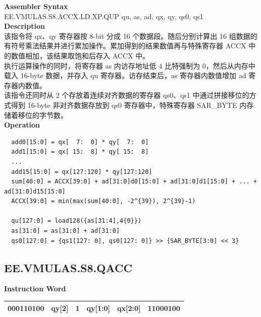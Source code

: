 \textbf{Assembler Syntax} \\
EE.VMULAS.S8.ACCX.LD.XP.QUP qu, as, ad, qx, qy, qs0, qs1 \\
\textbf{Description} \\
该指令将 qx、qy 寄存器按 8-bit 分成 16 个数据段。随后分别计算出 16 组数据的有符号乘法结果并进行累加操作。累加得到的结果数值再与特殊寄存器 ACCX 中的数值相加，该结果取饱和后存入 ACCX 中。\\
执行运算操作的同时，将寄存器 as 内访存地址低 4 比特强制为 0，然后从内存中载入 16-byte 数据，并存入 qu 寄存器。访存结束后，as 寄存器内数值增加 ad 寄存器内数值。\\
该指令还同时从 2 个存放着连续对齐数据的寄存器 qs0、qs1 中通过拼接移位的方式得到 16-byte 非对齐数据存放到 qs0 寄存器中，特殊寄存器 SAR\_BYTE 内存储着移位的字节数。\\
\textbf{Operation}
\begin{lstlisting}
  add0[15:0] = qx[  7:  0] * qy[  7:  0]
  add1[15:0] = qx[ 15:  8] * qy[ 15:  8]
  ...
  add15[15:0] = qx[127:120] * qy[127:120]
  sum[40:0] = ACCX[39:0] + ad[31:0]d0[15:0] + ad[31:0]d1[15:0] + ... + ad[31:0]d15[15:0]
  ACCX[39:0] = min(max(sum[40:0], -2^{39}), 2^{39}-1)

  qu[127:0] = load128({as[31:4],4{0}})
  as[31:0] = as[31:0] + ad[31:0]
  qs0[127:0] = {qs1[127: 0], qs0[127: 0]} >> {SAR_BYTE[3:0] << 3}
\end{lstlisting}

\clearpage
\subsection{EE.VMULAS.S8.QACC}\label{instruction:EEVMULASS8QACC}
\setlength\tabcolsep{6pt}
\textbf{Instruction Word} \\
\begin{tabular}{|c|c|c|c|c|c|}
	\hline
	000110100 & qy[2] & 1 & qy[1:0] & qx[2:0] & 11000100 \\
	\hline
\end{tabular}

